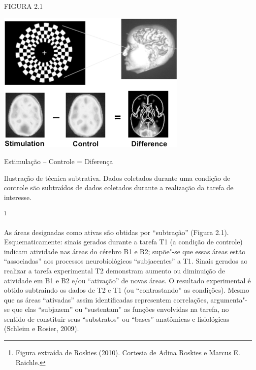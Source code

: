 \begin{center}
\footnotesize{FIGURA 2.1

\includegraphics[width=3.67012in,height=2.7367in]{imgs/1.png}

Estimulação -- Controle = Diferença

Ilustração de técnica subtrativa. Dados coletados durante uma condição
de controle são subtraídos de dados coletados durante a realização da
tarefa de interesse.}\footnote[10]{Figura extraída de Roskies (2010). Cortesia
de Adina Roskies e Marcus E. Raichle.}
\end{center}

As áreas designadas como ativas são obtidas por ``subtração'' (Figura
2.1). Esquematicamente: sinais  gerados durante a tarefa T1 (a
condição de controle) indicam atividade nas áreas do cérebro B1 e B2;
supõe"-se que essas áreas estão ``associadas'' aos processos
neurobiológicos ``subjacentes'' a T1. Sinais  gerados ao realizar a
tarefa experimental T2 demonstram aumento ou diminuição de atividade em
B1 e B2 e/ou ``ativação'' de novas áreas. O resultado experimental é
obtido subtraindo os dados de T2 e T1 (ou ``contrastando'' as
condições). Mesmo que as áreas ``ativadas'' assim identificadas
representem correlações, argumenta"-se que elas ``subjazem'' ou
``sustentam'' as funções envolvidas na tarefa, no sentido de constituir
seus ``substratos'' ou ``bases'' anatômicas e fisiológicas (Schleim e
Rosier, 2009).

